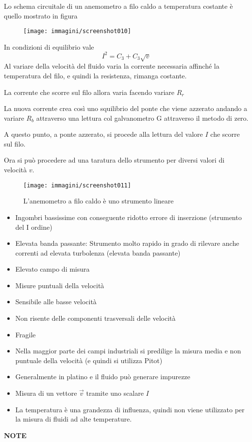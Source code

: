 \documentclass[a4paper, 15pt]{article}
\newcommand{\cmark}{\ding{51}}
\newcommand{\xmark}{\ding{55}}
\newcommand{\compresslist}{\setlength{\itemsep}{1pt}\setlength{\parskip}{0pt}\setlength{\parsep}{0pt}}
\begin{document}
\begin{adjustwidth}{2in}{}		
	Lo schema circuitale di un anemometro a filo caldo a temperatura costante è quello mostrato in figura
	\begin{figure}[H]
		\centering
		\texttt{[image: immagini/screenshot010]}
		\label{fig:screenshot010}
	\end{figure}
	In condizioni di equilibrio vale 
	\[I^2 = C_3+C_3\sqrt{v}\]
	Al variare della velocità del fluido varia la corrente necessaria affinché la temperatura del filo, e quindi la resistenza, rimanga
	costante.
	
	La corrente che scorre sul filo allora varia facendo variare $R_r$
	
	La nuova corrente crea così uno squilibrio del ponte che viene azzerato andando a variare $R_b$ attraverso una lettura col galvanometro G attraverso il metodo di zero. \newline
	
	A questo punto, a ponte azzerato, si procede alla lettura del valore $I$ che scorre sul filo.
	
	Ora si può procedere ad una taratura dello strumento per diversi valori di velocità $v$. 
	\begin{figure}[H]
		\centering
		\texttt{[image: immagini/screenshot011]}
		\caption{L'anemometro a filo caldo è uno strumento lineare}
		\label{fig:screenshot011}
	\end{figure}
	
	\begin{itemize}[label = \textcolor{green}{\cmark}] \compresslist
		\item Ingombri bassissime con conseguente ridotto errore di inserzione (strumento del I ordine)
		\item Elevata banda passante: Strumento molto rapido in grado di rilevare anche correnti ad elevata
		turbolenza (elevata banda passante)
		\item Elevato campo di misura
		\item Misure puntuali della velocità
		\item Sensibile alle basse velocità
		\item Non risente delle componenti trasversali delle velocità
	\end{itemize}
	
	\begin{itemize}[label = \textcolor{red}{\xmark}] \compresslist
		\item Fragile 
		\item Nella maggior parte dei campi industriali si predilige la misura media e
		non puntuale della velocità (e quindi si utilizza Pitot)
		\item Generalmente in platino e il fluido può generare impurezze
		\item Misura di un vettore $\vec{v}$ tramite uno scalare $I$
		\item La temperatura è una grandezza di influenza, quindi non viene utilizzato per la misura di fluidi ad alte temperature.
	\end{itemize}
	\newpage
	{\LARGE \textbf{NOTE}}
	
\end{adjustwidth}	
\end{document}
